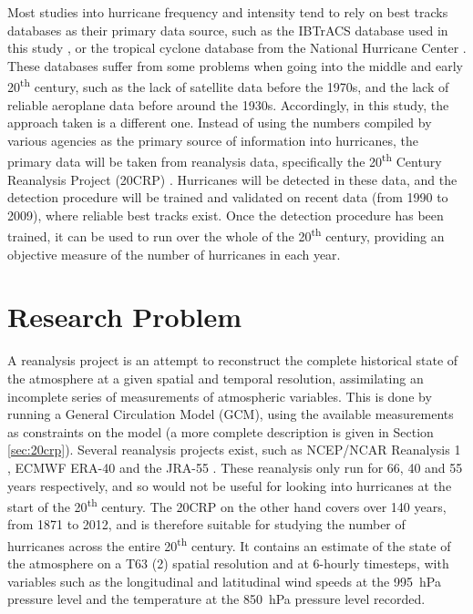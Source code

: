 \documentclass[pdftex,12pt,a4paper]{report}
\newcommand{\ts}{\textsuperscript}
\begin{document}
Most studies into hurricane frequency and intensity tend to rely on best tracks databases as their
primary data source, such as the IBTrACS database used in this study
\parencite{knappInternational2010}, or the tropical cyclone database from the National Hurricane
Center \parencite{jarvinianTropical1984}. These databases suffer from some problems when going into
the middle and early 20\ts{th} century, such as the lack of satellite data before the 1970s, and the
lack of reliable aeroplane data before around the 1930s. Accordingly, in this study, the approach
taken is a different one. Instead of using the numbers compiled by various agencies as the primary
source of information into hurricanes, the primary data will be taken from reanalysis data,
specifically the 20\ts{th} Century Reanalysis Project (20CRP) \parencite{compoTwentieth2011}.
Hurricanes will be detected in these data, and the detection procedure will be trained and validated
on recent data (from 1990 to 2009), where reliable best tracks exist. Once the detection procedure
has been trained, it can be used to run over the whole of the 20\ts{th} century, providing an
objective measure of the number of hurricanes in each year.

\section{Research Problem}


A reanalysis project is an attempt to reconstruct the complete historical state of the atmosphere at
a given spatial and temporal resolution, assimilating an incomplete series of measurements of
atmospheric variables. This is done by running a General Circulation Model (GCM), using the
available measurements as constraints on the model (a more complete description is given in Section
\ref{sec:20crp}). Several reanalysis projects exist, such as NCEP/NCAR Reanalysis 1
\parencite{TODOCITE}, ECMWF ERA-40 \parencite{uppalaEra2006} and the JRA-55 \parencite{TODOCITE}.
These reanalysis only run for 66, 40 and 55 years respectively, and so would not be useful for
looking into hurricanes at the start of the 20\ts{th} century. The 20CRP on the other hand covers
over 140 years, from 1871 to 2012, and is therefore suitable for studying the number of hurricanes
across the entire 20\ts{th} century.  It contains an estimate of the state of the atmosphere on a
T63 (2\textdegree) spatial resolution and at 6-hourly timesteps, with variables such as the
longitudinal and latitudinal wind speeds at the \SI{995}{hPa} pressure level and the temperature at
the \SI{850}{hPa} pressure level recorded.
\end{document}
